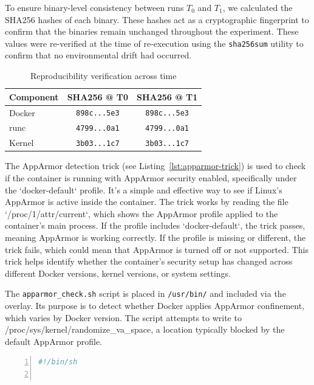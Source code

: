 \documentclass[12pt]{report}
\begin{document}
\begin{doublespace}
To ensure binary-level consistency between runs \texttt{\( T_0 \)} and \texttt{\( T_1 \)}, we calculated the SHA256 hashes of each binary. These hashes act as a cryptographic fingerprint to confirm that the binaries remain unchanged throughout the experiment. These values were re-verified at the time of re-execution using the \texttt{sha256sum} utility to confirm that no environmental drift had occurred.

\begin{table}[H]
\centering
\caption{Reproducibility verification across time}
\begin{tabular}{|l|c|c|}
\hline
\textbf{Component} & \textbf{SHA256 @ T0} & \textbf{SHA256 @ T1} \\
\hline
Docker & \texttt{898c...5e3} & \texttt{898c...5e3} \\
runc & \texttt{4799...0a1} & \texttt{4799...0a1} \\
Kernel & \texttt{3b03...1c7} & \texttt{3b03...1c7} \\
\hline
\end{tabular}
\end{table}


The AppArmor detection trick (see Listing~\ref{lst:apparmor-trick}) is used to check if the container is running with AppArmor security enabled, specifically under the `docker-default` profile. It’s a simple and effective way to see if Linux’s AppArmor is active inside the container. The trick works by reading the file `/proc/1/attr/current`, which shows the AppArmor profile applied to the container’s main process. If the profile includes `docker-default`, the trick passes, meaning AppArmor is working correctly. If the profile is missing or different, the trick fails, which could mean that AppArmor is turned off or not supported. This trick helps identify whether the container's security setup has changed across different Docker versions, kernel versions, or system settings.

The \texttt{apparmor\_check.sh} script is placed in \texttt{/usr/bin/} and included via the overlay. Its purpose is to detect whether Docker applies AppArmor confinement, which varies by Docker version. The script attempts to write to /proc/sys/kernel/randomize\_va\_space, a location typically blocked by the default AppArmor profile.

\begin{lstlisting}[language=bash, caption={AppArmor Enforcement Trick Script}, label={lst:apparmor-trick}, numbers=left, numberstyle=\tiny, stepnumber=1, breaklines=true, frame=single, backgroundcolor=\color{gray!10}, basicstyle=\ttfamily\footnotesize, showspaces=false, showstringspaces=false]
#!/bin/sh


\end{lstlisting}
\end{doublespace}
\end{document}
